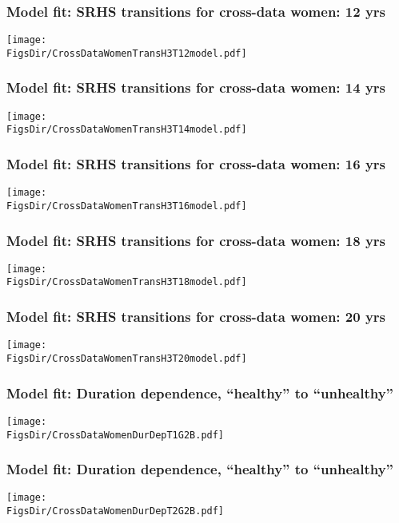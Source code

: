 \documentclass[aspectratio=169]{beamer}
\newcommand{\FigsDir}{../Figures}
\begin{document}
\begin{frame}\frametitle{Model fit: SRHS transitions for cross-data women: 12 yrs}
\begin{center}
	\texttt{[image: \\FigsDir/CrossDataWomenTransH3T12model.pdf]}
\end{center}
\end{frame}

\begin{frame}\frametitle{Model fit: SRHS transitions for cross-data women: 14 yrs}
\begin{center}
	\texttt{[image: \\FigsDir/CrossDataWomenTransH3T14model.pdf]}
\end{center}
\end{frame}

\begin{frame}\frametitle{Model fit: SRHS transitions for cross-data women: 16 yrs}
\begin{center}
	\texttt{[image: \\FigsDir/CrossDataWomenTransH3T16model.pdf]}
\end{center}
\end{frame}

\begin{frame}\frametitle{Model fit: SRHS transitions for cross-data women: 18 yrs}
\begin{center}
	\texttt{[image: \\FigsDir/CrossDataWomenTransH3T18model.pdf]}
\end{center}
\end{frame}

\begin{frame}\frametitle{Model fit: SRHS transitions for cross-data women: 20 yrs}
\begin{center}
	\texttt{[image: \\FigsDir/CrossDataWomenTransH3T20model.pdf]}
\end{center}
\end{frame}

\begin{frame}\frametitle{Model fit: Duration dependence, ``healthy'' to ``unhealthy''}
\begin{center}
	\texttt{[image: \\FigsDir/CrossDataWomenDurDepT1G2B.pdf]}
\end{center}
\end{frame}

\begin{frame}\frametitle{Model fit: Duration dependence, ``healthy'' to ``unhealthy''}
\begin{center}
	\texttt{[image: \\FigsDir/CrossDataWomenDurDepT2G2B.pdf]}
\end{center}
\end{frame}
\end{document}
